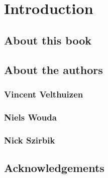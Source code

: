  

\chapter{Introduction}

	\section{About this book}

	\section{About the authors}

		\subsection{Vincent Velthuizen}

		\subsection{Niels Wouda}

		\subsection{Nick Szirbik}

	\section{Acknowledgements}

